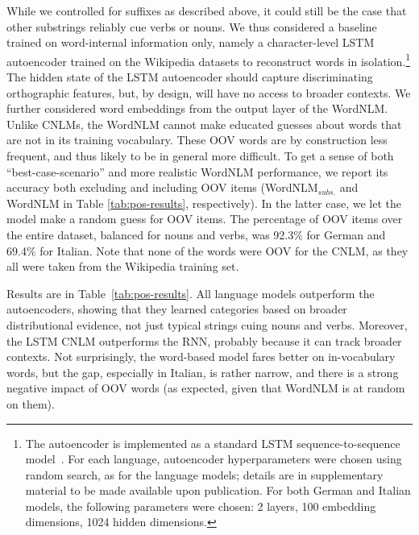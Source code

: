 While we controlled for suffixes as described above, it could still be
the case that other substrings reliably cue verbs or nouns. We thus
considered a baseline trained on word-internal information only,
namely a character-level LSTM autoencoder trained on the Wikipedia datasets to reconstruct words 
in isolation.\footnote{The autoencoder is implemented as a standard LSTM sequence-to-sequence model~\citep{sutskever2014sequence}. For each language, autoencoder hyperparameters were chosen using random search, as for the language models; details are in supplementary material to be made available upon publication. For both German and Italian models, the following parameters were chosen: 2 layers, 100 embedding dimensions, 1024 hidden dimensions.}
The hidden state of the LSTM autoencoder should capture
discriminating orthographic features, but, by design, will have
no access to broader contexts.  We further considered word embeddings
from the output layer of the WordNLM. Unlike CNLMs, the WordNLM cannot
make educated guesses about words that are not in its training
vocabulary. These OOV words are by construction less frequent, and
thus likely to be in general more difficult. To get a sense of both
``best-case-scenario'' and more realistic WordNLM performance, we
report its accuracy both excluding and including OOV items
(WordNLM$_{\textit{subs.}}$ and WordNLM in Table
\ref{tab:pos-results}, respectively). In the latter case, we let the
model make a random guess for OOV items.  The percentage of OOV items
over the entire dataset, balanced for nouns and verbs, was 92.3\% for
German and 69.4\% for Italian.
Note that none of the words were OOV for the CNLM, as they all were taken from the Wikipedia training set.

Results are in Table~\ref{tab:pos-results}.  All language models
outperform the autoencoders, showing that they learned categories
based on broader distributional evidence, not just typical strings
cuing nouns and verbs. Moreover, the LSTM CNLM outperforms the RNN,
probably because it can track broader contexts. Not surprisingly, the
word-based model fares better on in-vocabulary words, but the gap,
especially in Italian, is rather narrow, and there is a strong
negative impact of OOV
words (as expected, given that WordNLM is at random on them). %

